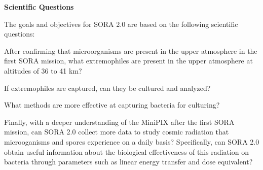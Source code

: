 {\bf Scientific Questions}

The goals and objectives for SORA 2.0 are based on the following scientific questions: 
%
\begin{itemize}
	{\indentitem \item After confirming that microorganisms are present in the upper atmosphere in the first SORA mission, what extremophiles are present in the upper atmosphere at altitudes of 36 to 41 km?}
	{\indentitem \item If extremophiles are captured, can they be cultured and analyzed?}
	{\indentitem \item What methods are more effective at capturing bacteria for culturing?} 
	{\indentitem \item Finally, with a deeper understanding of the MiniPIX after the first SORA mission, can SORA 2.0 collect more data to study cosmic radiation that microoganisms and spores experience on a daily basis? Specifically, can SORA 2.0 obtain useful information about the biological effectiveness of this radiation on bacteria through parameters such as linear energy transfer and dose equivalent?}
\end{itemize}
%



